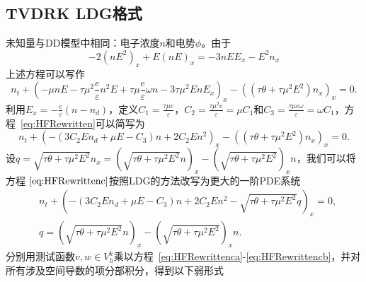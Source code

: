 \subsection{TVDRK LDG格式}
未知量与DD模型中相同：电子浓度$n$和电势$\phi$。由于
$$
    -2\left(n E^{2}\right)_{x}+E(n E)_{x}=-3 n E E_{x}-E^{2} n_{x}
$$
上述方程可以写作
\begin{equation}
    n_{t}+\left(-\mu n E-\tau \mu^{2} \frac{e}{\varepsilon} n^{2} E+\tau \mu \frac{e}{\varepsilon} \omega n-3 \tau \mu^{2} E n E_{x}\right)_{x}-\left(\left(\tau \theta+\tau \mu^{2} E^{2}\right) n_{x}\right)_{x}=0.\label{eq:HFRewritten}
\end{equation}
利用$E_{x}=-\frac{e}{\varepsilon}\left(n-n_{d}\right)$，定义$C_{1}=\frac{\tau \mu e}{\varepsilon}$，$C_{2}=\frac{\tau \mu^{2} e}{\varepsilon}=\mu C_{1}$和$C_{3}=\frac{\tau \mu e \omega}{\varepsilon}=\omega C_{1}$，方程~\eqref{eq:HFRewritten}可以简写为
\begin{equation}
    n_{t}+\left(-\left(3 C_{2} E n_{d}+\mu E-C_{3}\right) n+2 C_{2} E n^{2}\right)_{x}-\left(\left(\tau \theta+\tau \mu^{2} E^{2}\right) n_{x}\right)_{x}=0 .  \label{eq:HFRewrittenc}
\end{equation}
设$q=\sqrt{\tau \theta+\tau \mu^{2} E^{2}} n_{x}=\left(\sqrt{\tau \theta+\tau \mu^{2} E^{2}} n\right)_{x}-\left(\sqrt{\tau \theta+\tau \mu^{2} E^{2}}\right)_{x} n$，我们可以将方程$~\eqref{eq:HFRewrittenc}$按照LDG的方法改写为更大的一阶PDE系统
\begin{align}
     & n_{t}+\left(-\left(3 C_{2} E n_{d}+\mu E-C_{3}\right) n+2 C_{2} E n^{2}-\sqrt{\tau \theta+\tau \mu^{2} E^{2}} q\right)_{x}=0, \label{eq:HFRewrittenca} \\
     & q=\left(\sqrt{\tau \theta+\tau \mu^{2} E^{2}} n\right)_{x}-\left(\sqrt{\tau \theta+\tau \mu^{2} E^{2}}\right)_{x} n.\label{eq:HFRewrittencb}
\end{align}
分别用测试函数$v, w \in V_{h}^{k}$乘以方程~\eqref{eq:HFRewrittenca}-\eqref{eq:HFRewrittencb}，并对所有涉及空间导数的项分部积分，得到以下弱形式
